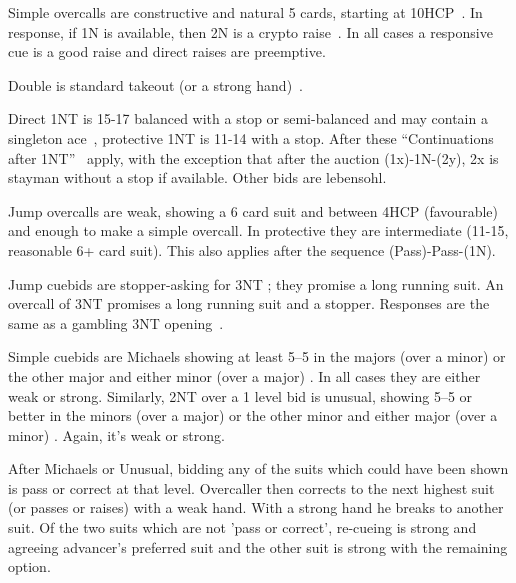\documentclass[a4paper,14pt]{extarticle}
\begin{document}
Simple overcalls are constructive and natural 5 cards, starting at
10HCP~. In response, if 1N is available, then 2N is a crypto
raise~. In all cases a responsive cue is a good raise and
direct raises are preemptive.

Double is standard takeout (or a strong hand)~.

Direct 1NT is 15-17 balanced with a stop or semi-balanced and may contain a
singleton ace~, protective 1NT is 11-14 with a stop.  After these
``Continuations after 1NT''~ apply, with the exception that
after the auction (1x)-1N-(2y), 2x is stayman without a stop if available.
Other bids are lebensohl.

Jump overcalls are weak, showing a 6 card suit and between 4HCP (favourable)
and enough to make a simple overcall. In protective they are intermediate
(11-15, reasonable 6+ card suit). This also applies after the sequence (Pass)-Pass-(1N).

Jump cuebids are stopper-asking for 3NT ; they promise a long
running suit.  An overcall of 3NT promises a long running suit and a stopper.
Responses are the same as a gambling 3NT opening~.


Simple cuebids are Michaels showing at least 5--5 in the majors (over a minor)
or the other major and either minor (over a major) . In all cases they are
either weak or strong. Similarly, 2NT over a 1 level bid is unusual, showing
5--5 or better in the minors (over a major) or the other minor and either major
(over a minor) . Again, it's weak or strong.

After Michaels or Unusual, bidding any of the suits which could have been shown
is pass or correct at that level. Overcaller then corrects to the next highest
suit (or passes or raises) with a weak hand. With a strong hand he breaks to
another suit. Of the two suits which are not 'pass or correct', re-cueing is
strong and agreeing advancer's preferred suit and the other suit is strong with
the remaining option.

\newpage
\end{document}

